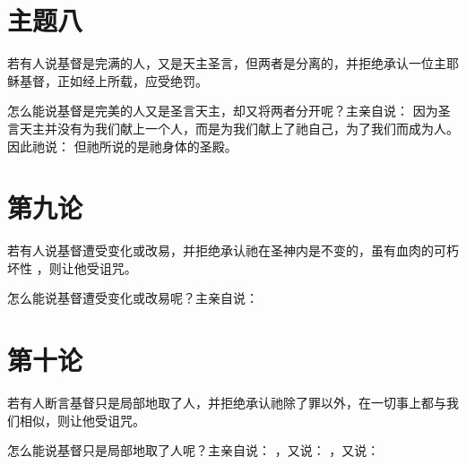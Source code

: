 
\section{主题八}

若有人说基督是完满的人，又是天主圣言，但两者是分离的，并拒绝承认一位主耶稣基督，正如经上所载，应受绝罚。\par

\par

怎么能说基督是完美的人又是圣言天主，却又将两者分开呢？主亲自说：  因为圣言天主并没有为我们献上一个人，而是为我们献上了祂自己，为了我们而成为人。因此祂说： 但祂所说的是祂身体的圣殿。\par


\section{第九论}

若有人说基督遭受变化或改易，并拒绝承认祂在圣神内是不变的，虽有血肉的可朽坏性 ，则让他受诅咒。\par

\par

怎么能说基督遭受变化或改易呢？主亲自说： \par


\section{第十论}

若有人断言基督只是局部地取了人，并拒绝承认祂除了罪以外，在一切事上都与我们相似，则让他受诅咒。\par

\par

怎么能说基督只是局部地取了人呢？主亲自说： ，又说： ，又说： \par

